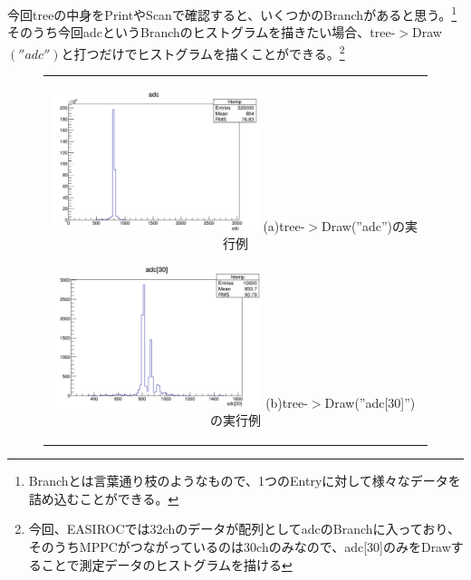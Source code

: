 \documentclass[10pt]{ujarticle}
\begin{document}
今回treeの中身をPrintやScanで確認すると、いくつかのBranchがあると思う。\footnote{Branchとは言葉通り枝のようなもので、1つのEntryに対して様々なデータを詰め込むことができる。}そのうち今回adcというBranchのヒストグラムを描きたい場合、tree-$>$Draw$\left(''adc''\right)$と打つだけでヒストグラムを描くことができる。\footnote{今回、EASIROCでは32chのデータが配列としてadcのBranchに入っており、そのうちMPPCがつながっているのは30chのみなので、adc[30]のみをDrawすることで測定データのヒストグラムを描ける}
\begin{figure}[htbp]
\begin{center}
  \begin{tabular}{c}

    \begin{minipage}{0.5\hsize}
      \begin{center}
        \includegraphics[clip, width=60mm]{SummerChallenge_tree_draw_adc.png}
        \hspace{1.6cm} (a)tree-$>$Draw(''adc'')の実行例
      \end{center}
    \end{minipage}

    \begin{minipage}{0.5\hsize}
      \begin{center}
        \includegraphics[clip, width=60mm]{SummerChallenge_tree_draw_adc30.png}
        \hspace{1.6cm} (b)tree-$>$Draw(''adc[30]'')の実行例
      \end{center}
    \end{minipage}
  \end{tabular}
  \label{fig:tree_draw}
  \end{center}
\end{figure}
\end{document}
